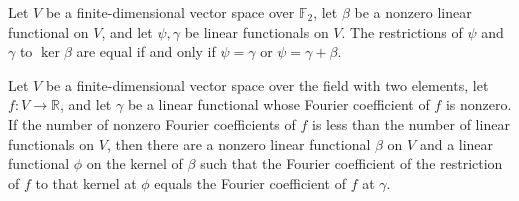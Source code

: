 \begin{theorem}
\label{FABL.dualRestrict_ker_fiber_iff}
\leanok
{}
Let $V$ be a finite-dimensional vector space over $\mathbb{F}_2$, let $\beta$ be a
nonzero linear functional on $V$, and let $\psi,\gamma$ be linear functionals on $V$.
The restrictions of $\psi$ and $\gamma$ to $\ker\beta$ are equal if and only if
$\psi=\gamma$ or $\psi=\gamma+\beta$.
\end{theorem}

\begin{theorem}
\label{FABL.exists_nonzero_dualFourierCoeff_subspaceRestriction_eq}
\leanok
{}
Let $V$ be a finite-dimensional vector space over the field with two elements, let
$f:V\to\mathbb{R}$, and let $\gamma$ be a linear functional whose Fourier coefficient of
$f$ is nonzero. If the number of nonzero Fourier coefficients of $f$ is less than the
number of linear functionals on $V$, then there are a nonzero linear functional $\beta$
on $V$ and a linear functional $\phi$ on the kernel of $\beta$ such that the Fourier
coefficient of the restriction of $f$ to that kernel at $\phi$ equals the Fourier
coefficient of $f$ at $\gamma$.
\end{theorem}

